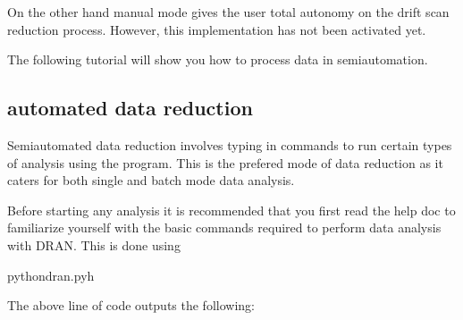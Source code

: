 \documentclass[letterpaper,10pt,english]{sphinxmanual}
\begin{document}
\sphinxAtStartPar
On the other hand manual mode gives the user total autonomy on the drift scan
reduction process. However, this implementation has not been activated yet.

\sphinxAtStartPar
The following tutorial will show you how to process data in semi\sphinxhyphen{}automation.


\subsection{automated data reduction}
\label{\detokenize{extras/cli:automated-data-reduction}}
\sphinxAtStartPar
Semi\sphinxhyphen{}automated data reduction involves typing in commands to
run certain types of analysis using the program. This is the
prefered mode of data reduction as it caters for both single
and batch mode data analysis.

\sphinxAtStartPar
Before starting any analysis it is recommended that you first
read the help doc to familiarize yourself with the basic commands
required to perform data analysis with DRAN. This is done using

\begin{sphinxVerbatim}[commandchars=\\\{\}]
\PYGZdl{}pythondran.py\PYGZhy{}h
\end{sphinxVerbatim}

\sphinxAtStartPar
The above line of code outputs the following:
\end{document}
